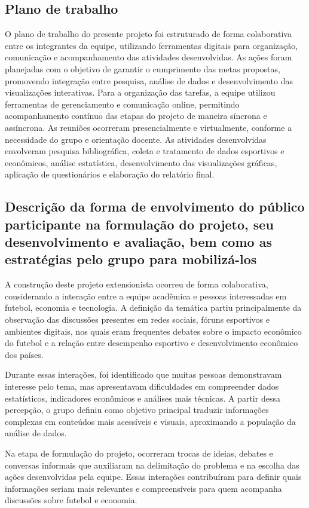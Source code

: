 \documentclass[12pt, a4paper, brazil]{article}
\begin{document}
\subsection{Plano de trabalho}
O plano de trabalho do presente projeto foi estruturado de forma colaborativa entre os integrantes da equipe, utilizando ferramentas digitais para organização, comunicação e acompanhamento das atividades desenvolvidas. As ações foram planejadas com o objetivo de garantir o cumprimento das metas propostas, promovendo integração entre pesquisa, análise de dados e desenvolvimento das visualizações interativas.
Para a organização das tarefas, a equipe utilizou ferramentas de gerenciamento e comunicação online, permitindo acompanhamento contínuo das etapas do projeto de maneira síncrona e assíncrona. As reuniões ocorreram presencialmente e virtualmente, conforme a necessidade do grupo e orientação docente.
As atividades desenvolvidas envolveram pesquisa bibliográfica, coleta e tratamento de dados esportivos e econômicos, análise estatística, desenvolvimento das visualizações gráficas, aplicação de questionários e elaboração do relatório final.

\subsection{Descrição da forma de envolvimento do público participante na formulação do projeto, seu desenvolvimento e avaliação, bem como as estratégias pelo grupo para mobilizá-los}

A construção deste projeto extensionista ocorreu de forma colaborativa, considerando a interação entre a equipe acadêmica e pessoas interessadas em futebol, economia e tecnologia. A definição da temática partiu principalmente da observação das discussões presentes em redes sociais, fóruns esportivos e ambientes digitais, nos quais eram frequentes debates sobre o impacto econômico do futebol e a relação entre desempenho esportivo e desenvolvimento econômico dos países.

Durante essas interações, foi identificado que muitas pessoas demonstravam interesse pelo tema, mas apresentavam dificuldades em compreender dados estatísticos, indicadores econômicos e análises mais técnicas. A partir dessa percepção, o grupo definiu como objetivo principal traduzir informações complexas em conteúdos mais acessíveis e visuais, aproximando a população da análise de dados.

Na etapa de formulação do projeto, ocorreram trocas de ideias, debates e conversas informais que auxiliaram na delimitação do problema e na escolha das ações desenvolvidas pela equipe. Essas interações contribuíram para definir quais informações seriam mais relevantes e compreensíveis para quem acompanha discussões sobre futebol e economia.
\end{document}
